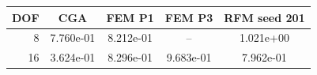 \begin{tabular}{rcccc}
\toprule
DOF & CGA & FEM P1 & FEM P3 & RFM seed 201 \\
\midrule
8 & 7.760e-01 & 8.212e-01 & -- & 1.021e+00 \\
16 & 3.624e-01 & 8.296e-01 & 9.683e-01 & 7.962e-01 \\
\bottomrule
\end{tabular}

